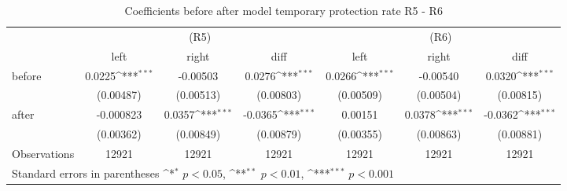 \begin{table}[!ht]\centering \footnotesize
\def\sym#1{\ifmmode^{#1}\else\(^{#1}\)\fi}
\caption{Coefficients before after model temporary protection rate R5 - R6}
\begin{tabular}{l*{6}{c}}
\hline\hline
                    &\multicolumn{3}{c}{(R5)}&\multicolumn{3}{c}{(R6)}\\
&\multicolumn{1}{c}{left}&\multicolumn{1}{c}{right}&\multicolumn{1}{c}{diff}&\multicolumn{1}{c}{left}&\multicolumn{1}{c}{right}&\multicolumn{1}{c}{diff}\\
\hline
before              &      0.0225\sym{***}&    -0.00503         &      0.0276\sym{***}&      0.0266\sym{***}&    -0.00540         &      0.0320\sym{***}\\
                    &   (0.00487)         &   (0.00513)         &   (0.00803)         &   (0.00509)         &   (0.00504)         &   (0.00815)         \\
[0,5em]
after               &   -0.000823         &      0.0357\sym{***}&     -0.0365\sym{***}&     0.00151         &      0.0378\sym{***}&     -0.0362\sym{***}\\
                    &   (0.00362)         &   (0.00849)         &   (0.00879)         &   (0.00355)         &   (0.00863)         &   (0.00881)         \\
\hline
Observations        &       12921         &       12921         &       12921         &       12921         &       12921         &       12921         \\
\hline\hline
\multicolumn{7}{l}{\footnotesize Standard errors in parentheses \sym{*} \(p<0.05\), \sym{**} \(p<0.01\), \sym{***} \(p<0.001\)}\\
\end{tabular}
\end{table}
